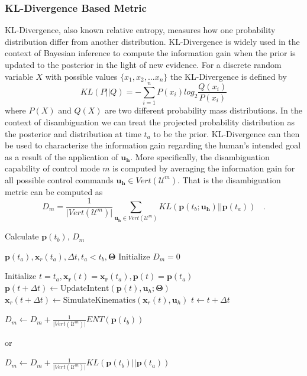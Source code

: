 \documentclass[conference]{IEEEtran}
\begin{document}
\subsubsection{KL-Divergence Based Metric}\label{sssec:kl}
KL-Divergence, also known relative entropy, measures how one probability distribution differ from another distribution. KL-Divergence is widely used in the context of Bayesian inference to compute the information gain when the prior is updated to the posterior in the light of new evidence. For a discrete random variable $X$ with possible values $\{x_1, x_2,\dots x_n\}$ the KL-Divergence is defined by
\begin{equation*}
KL(P||Q) = -\sum_{i=1}^{n}P(x_i)log_2\frac{Q(x_i)}{P(x_i)}
\end{equation*}
where $P(X)$ and $Q(X)$ are two different probability mass distributions. 
In the context of disambiguation we can treat the projected probability distribution as the posterior and distribution at time $t_a$ to be the prior. KL-Divergence can then be used to characterize the information gain regarding the human's intended goal as a result of the application of $\boldsymbol{u_h}$. More specifically, the disambiguation capability of control mode $m$ is computed by averaging the information gain for all possible control commands $\boldsymbol{u_h} \in Vert(\mathcal{U}^m)$. That is the disambiguation metric can be computed as 
\begin{equation*}
D_m = \frac{1}{\vert Vert(\mathcal{U}^m) \vert}\sum_{\boldsymbol{u_h} \in Vert(\mathcal{U}^m)} KL(\boldsymbol{p}(t_b; \boldsymbol{u_h})||\boldsymbol{p}(t_a))~~~~.
\end{equation*}
\begin{algorithm}[t]
	\caption{Calculate $\boldsymbol{p}(t_b)$, $D_m$}
	\label{alg:disamb}
	\begin{algorithmic}[1]
		\REQUIRE $\boldsymbol{p}(t_a), \boldsymbol{x}_r(t_a), \Delta t, t_a < t_b, \boldsymbol{\Theta}$
		\STATE Initialize $D_m = 0$
		
		\STATE Initialize $t = t_a, \boldsymbol{x_r}(t) = \boldsymbol{x_r}(t_a), \boldsymbol{p}(t) = \boldsymbol{p}(t_a)$
		\STATE $\boldsymbol{p}(t + \Delta t) \leftarrow \text{UpdateIntent}(\boldsymbol{p}(t), \boldsymbol{u}_h; \boldsymbol{\Theta})$
		\STATE $\boldsymbol{x}_r(t + \Delta t) \leftarrow \text{SimulateKinematics}(\boldsymbol{x}_r(t), \boldsymbol{u}_h)$
		\STATE $t \leftarrow t + \Delta t$
		\ENDWHILE
		
		\STATE $D_m \leftarrow D_m + \frac{1}{\vert Vert(\mathcal{U}^m) \vert} ENT(\boldsymbol{p}(t_b)) $
		
		or
		
		\STATE $D_m \leftarrow D_m + \frac{1}{\vert Vert(\mathcal{U}^m) \vert} KL(\boldsymbol{p}(t_b) \vert\vert \boldsymbol{p}(t_a)) $
		
		\ENDFOR
		\ENDFOR
	\end{algorithmic}
\end{algorithm}
\end{document}
